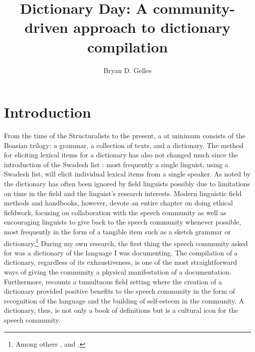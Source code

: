 \documentclass[output=paper,
modfonts
]{langscibook}
\title{Dictionary Day: A community-driven approach to dictionary compilation}
\author{Bryan D. Gelles \affiliation{University of Florida} }
\begin{document}
\maketitle

 
 

 
 

\section{Introduction}

From the time of the Structuralists to the present, a  at minimum consists of the Boasian trilogy: a grammar, a collection of texts, and a dictionary. The method for eliciting lexical items for a dictionary has also not changed much since the introduction of the Swadesh list \citep{Swadesh1955}: most frequently a single linguist, using a Swadesh list, will elicit individual lexical items from a single speaker. As noted by \citet{ChelliahDeReuse2011} the dictionary has often been ignored by field linguists possibly due to limitations on time in the field and the linguist’s research interests. Modern linguistic field methods and  handbooks, however, devote an entire chapter on doing ethical fieldwork, focusing on collaboration with the speech community as well as encouraging linguists to give back to the speech community whenever possible, most frequently in the form of a tangible item such as a sketch grammar or dictionary.\footnote{ Among others \citet{Bowern2008,ChelliahDeReuse2011}, and \citet{VauxCooper2007}.} During my own research, the first thing the speech community asked for was a dictionary of the language I was documenting. The compilation of a dictionary, regardless of its exhaustiveness, is one of the most straightforward ways of giving the community a physical manifestation of a documentation. Furthermore, \citet{Hill2012} recounts a tumultuous field setting where the creation of a dictionary provided positive benefits to the speech community in the form of recognition of the language and the building of self-esteem in the community. A dictionary, thus, is not only a book of definitions but is a cultural icon for the speech community. 
\end{document}
